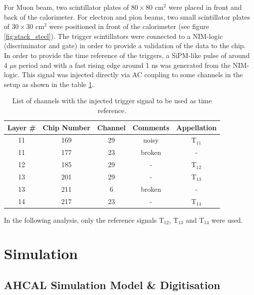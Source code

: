 \documentclass[twoside,a4paper,11pt]{article}
\begin{document}
For Muon beam, two scintillator plates of $80\times80$ cm$^2$ were placed in front and back of the calorimeter. For electron and pion beams, two small scintillator plates of $30\times30$ cm$^2$ were positioned in front of the calorimeter (see figure \ref{fig:stack_steel}). The trigger scintillators were connected to a NIM-logic (discriminator and gate) in order to provide a validation of the data to the chip. 
In order to provide the time reference of the triggers, a SiPM-like pulse of around 4 $\mu$s period and with a fast rising edge around 1 ns was generated from the NIM-logic. This signal was injected directly via AC coupling to some channels in the setup as shown in the table \ref{table:trigger_signal_list}. 
\begin{table}[htbp]
\centering
  \begin{tabular}{@{} ccccc @{}}
    \hline
    Layer \# & Chip Number & Channel & Comments & Appellation \\ 
    \hline
    11 & 169 & 29 & noisy & T$_{11}$ \\ 
    11 & 177 & 23 & broken & - \\
    12 & 185 & 29 & - & T$_{12}$ \\ 
    13 & 201 & 29 & -  & T$_{13}$ \\
    13 & 211 & 6 & broken & - \\ 
    14 & 217 & 23 & - & T$_{14}$ \\
    \hline
  \end{tabular}
  \caption{List of channels with the injected trigger signal to be used as time reference.}
  \label{table:trigger_signal_list}
\end{table}
In the following analysis, only the reference signals T$_{12}$,  T$_{13}$ and T$_{14}$ were used.

\section{Simulation}

\subsection{AHCAL Simulation Model \& Digitisation}
\end{document}
